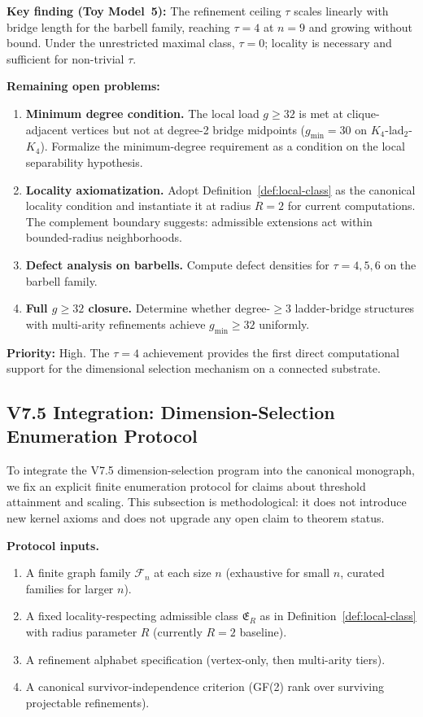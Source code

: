\documentclass[11pt,a4paper]{article}
\theoremstyle{definition}
\theoremstyle{remark}
\begin{document}
\textbf{Key finding (Toy Model~5):} The refinement ceiling $\tau$ scales linearly with bridge length for the barbell family, reaching $\tau = 4$ at $n = 9$ and growing without bound. Under the unrestricted maximal class, $\tau = 0$; locality is necessary and sufficient for non-trivial $\tau$.

\textbf{Remaining open problems:}
\begin{enumerate}[nosep]
  \item \textbf{Minimum degree condition.} The local load $g \geq 32$ is met at clique-adjacent vertices but not at degree-2 bridge midpoints ($g_{\min} = 30$ on $K_4$-lad$_2$-$K_4$). Formalize the minimum-degree requirement as a condition on the local separability hypothesis.
  \item \textbf{Locality axiomatization.} Adopt Definition~\ref{def:local-class} as the canonical locality condition and instantiate it at radius $R=2$ for current computations. The complement boundary suggests: admissible extensions act within bounded-radius neighborhoods.
  \item \textbf{Defect analysis on barbells.} Compute defect densities for $\tau = 4, 5, 6$ on the barbell family.
  \item \textbf{Full $g \geq 32$ closure.} Determine whether degree-$\geq 3$ ladder-bridge structures with multi-arity refinements achieve $g_{\min} \geq 32$ uniformly.
\end{enumerate}

\textbf{Priority:} High. The $\tau = 4$ achievement provides the first direct computational support for the dimensional selection mechanism on a connected substrate.

\subsection*{V7.5 Integration: Dimension-Selection Enumeration Protocol}\label{sec:v75-enum}
To integrate the V7.5 dimension-selection program into the canonical monograph, we fix an explicit finite enumeration protocol for claims about threshold attainment and scaling. This subsection is methodological: it does not introduce new kernel axioms and does not upgrade any open claim to theorem status.

\textbf{Protocol inputs.}
\begin{enumerate}[label=\textbf{E\arabic*.},nosep]
  \item A finite graph family $\mathcal{F}_n$ at each size $n$ (exhaustive for small $n$, curated families for larger $n$).
  \item A fixed locality-respecting admissible class $\mathfrak{E}_{R}$ as in Definition~\ref{def:local-class} with radius parameter $R$ (currently $R=2$ baseline).
  \item A refinement alphabet specification (vertex-only, then multi-arity tiers).
  \item A canonical survivor-independence criterion (GF(2) rank over surviving projectable refinements).
\end{enumerate}
\end{document}
